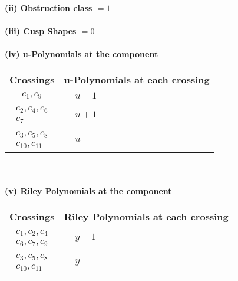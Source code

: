 \documentclass[1p]{elsarticle_modified}
\theoremstyle{definition}
\begin{document}
\flushleft \textbf{(ii) Obstruction class $= 1$}\\~\\
\flushleft \textbf{(iii) Cusp Shapes $= 0$}\\~\\
\newpage\renewcommand{\arraystretch}{1}
\flushleft \textbf{(iv) u-Polynomials at the component}\newline \\
\begin{tabular}{m{50pt}|m{274pt}}
Crossings & \hspace{64pt}u-Polynomials at each crossing \\
\hline $$\begin{aligned}c_{1},c_{9}\end{aligned}$$&$\begin{aligned}
&u-1
\end{aligned}$\\
\hline $$\begin{aligned}c_{2},c_{4},c_{6}\\c_{7}\end{aligned}$$&$\begin{aligned}
&u+1
\end{aligned}$\\
\hline $$\begin{aligned}c_{3},c_{5},c_{8}\\c_{10},c_{11}\end{aligned}$$&$\begin{aligned}
&u
\end{aligned}$\\
\hline
\end{tabular}\\~\\
\newpage\renewcommand{\arraystretch}{1}
\flushleft \textbf{(v) Riley Polynomials at the component}\newline \\
\begin{tabular}{m{50pt}|m{274pt}}
Crossings & \hspace{64pt}Riley Polynomials at each crossing \\
\hline $$\begin{aligned}c_{1},c_{2},c_{4}\\c_{6},c_{7},c_{9}\end{aligned}$$&$\begin{aligned}
&y-1
\end{aligned}$\\
\hline $$\begin{aligned}c_{3},c_{5},c_{8}\\c_{10},c_{11}\end{aligned}$$&$\begin{aligned}
&y
\end{aligned}$\\
\hline
\end{tabular}\\~\\
\end{document}
